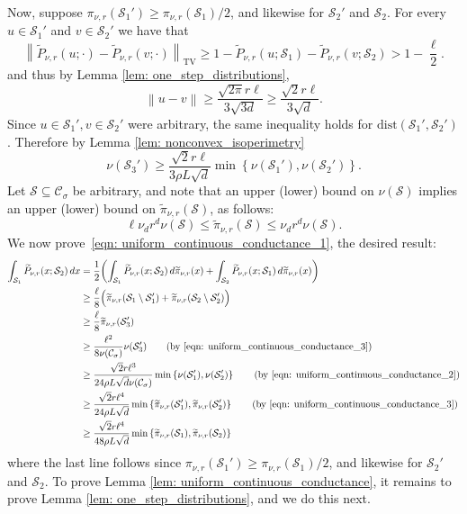 \documentclass[11pt,twoside]{article}
\theoremstyle{definition}
\newcommand{\set}[1]{\left\{#1\right\}}
\newcommand{\norm}[1]{\left\lVert#1\right\rVert}
\newcommand{\1}{\mathbbm{1}}
\newcommand{\Sset}{\mathcal{S}}
\newcommand{\Cset}{\mathcal{C}}
\newcommand{\Csig}{\Cset_{\sigma}}
\newcommand{\dx}{\,dx}
\begin{document}
Now, suppose $\pi_{\nu,r}(\Sset_1') \geq \pi_{\nu,r}(\Sset_1)/2$, and likewise for $\Sset_2'$ and $\Sset_2$. For every $u \in \Sset_1'$ and $v \in \Sset_2'$ we have that
\begin{equation*}
\norm{\widetilde{P}_{\nu,r}(u;\cdot) - \widetilde{P}_{\nu,r}(v;\cdot)}_{\mathrm{TV}} \geq 1 - \widetilde{P}_{\nu,r}(u;\Sset_1) - \widetilde{P}_{\nu,r}(v;\Sset_2) > 1 - \frac{\ell}{2}.
\end{equation*}
and thus by Lemma \ref{lem: one_step_distributions},
\begin{equation*}
\norm{u - v} \geq \frac{\sqrt{2 \pi } r \ell}{3 \sqrt{3 d}} \geq \frac{\sqrt{2}r \ell}{3\sqrt{d}}.
\end{equation*}
Since $u \in \Sset_1', v \in \Sset_2'$ were arbitrary, the same inequality holds for $\mathrm{dist}(\Sset_1', \Sset_2')$. Therefore by Lemma \ref{lem: nonconvex_isoperimetry}
\begin{equation}
\label{eqn: uniform_continuous_conductance_2}
\nu(\Sset_3') \geq  \frac{\sqrt{2} r \ell}{3 \rho L \sqrt{d}} \min \set{\nu(\Sset_1'), \nu(\Sset_2')}.
\end{equation}
Let $\Sset \subseteq \Csig$ be arbitrary, and note that an upper (lower) bound on $\nu(\Sset)$ implies an upper (lower) bound on $\widetilde{\pi}_{\nu,r}(\Sset)$, as follows:
\begin{equation}
\label{eqn: uniform_continuous_conductance_3}
\ell \nu_d r^d \nu(\Sset) \leq \widetilde{\pi}_{\nu,r}(\Sset) \leq \nu_d r^d \nu(\Sset).
\end{equation}
We now prove~\eqref{eqn: uniform_continuous_conductance_1}, the desired result:
\begin{align*}
\int_{\Sset_1} \widetilde{P}_{\nu,r}(x; \Sset_2) \dx & = \frac{1}{2} \biggl(\int_{\Sset_1} \widetilde{P}_{\nu,r}(x; \Sset_2)  \,d\widetilde{\pi}_{\nu,r}(x) + \int_{\Sset_2} \widetilde{P}_{\nu,r}(x; \Sset_1) \,d\widetilde{\pi}_{\nu,r}(x)\biggr) \\
& \geq \frac{\ell}{8} \Bigl( \widetilde{\pi}_{\nu,r}(\Sset_1 \setminus \Sset_1') + \widetilde{\pi}_{\nu,r}(\Sset_2 \setminus \Sset_2') \Bigr) \\
& \geq \frac{\ell}{8} \widetilde{\pi}_{\nu,r}(\Sset_3') \\
& \geq \frac{\ell^2}{8 \nu(\Csig)} \nu(\Sset_3') \tag{by \eqref{eqn: uniform_continuous_conductance_3}}\\
& \geq \frac{\sqrt{2} r \ell^3}{24 \rho L \sqrt{d} \nu(\Csig)} \min \set{\nu(\Sset_1'), \nu(\Sset_2')} \tag{by \eqref{eqn: uniform_continuous_conductance_2}}\\
& \geq \frac{\sqrt{2} r \ell^4}{24 \rho L \sqrt{d}} \min \set {\widetilde{\pi}_{\nu,r}(\Sset_1'), \widetilde{\pi}_{\nu,r}(\Sset_2')} \tag{by \eqref{eqn: uniform_continuous_conductance_3}}\\
& \geq \frac{\sqrt{2} r \ell^4}{48 \rho L \sqrt{d}} \min \set {\widetilde{\pi}_{\nu,r}(\Sset_1), \widetilde{\pi}_{\nu,r}(\Sset_2)}
\end{align*}
where the last line follows since $\pi_{\nu,r}(\Sset_1') \geq \pi_{\nu,r}(\Sset_1)/2$, and likewise for $\Sset_2'$ and $\Sset_2$. To prove Lemma \ref{lem: uniform_continuous_conductance}, it remains to prove Lemma \ref{lem: one_step_distributions}, and we do this next.
\end{document}
